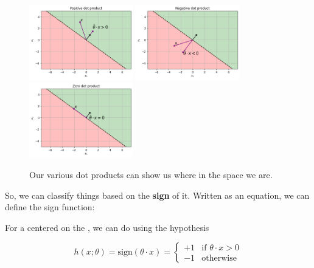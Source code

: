         \begin{figure}[H]
        
                \includegraphics[width=45mm,scale=0.3]{images/classification_images/positive_v_vector_theta_hat.png}
                \includegraphics[width=45mm,scale=0.3]{images/classification_images/negative_v_vector_theta_hat.png}
                \includegraphics[width=45mm,scale=0.3]{images/classification_images/zero_v_vector_theta_hat.png}
                
                \caption*{Our various dot products can show us where in the space we are.}
        \end{figure}        
        
        So, we can classify things based on the \textbf{sign} of it. Written as an equation, we can define the sign function:\\
        
        \begin{kequation}
            For a  centered on the , we can do  using the hypothesis
            
            \begin{equation*}
                h(x; \theta) = \text{sign}(\theta \cdot x )= 
                \begin{cases}
                    +1 & \text{if $\theta \cdot x > 0$} \\
                    -1 & \text{otherwise}
                \end{cases}
            \end{equation*}
        \end{kequation}
        

